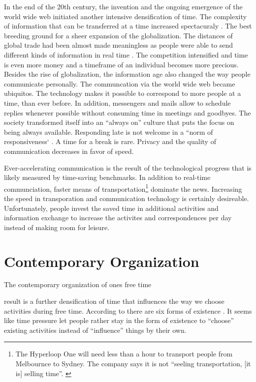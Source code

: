 \documentclass[12pt,numbers=noenddot,parskip,bibliography=totocnumbered,listof=totocnumbered]{scrreprt}
\begin{document}
In the end of the 20th century, the invention and the ongoing emergence of the world wide web initiated another intensive densification of time. The complexity of information that can be transferred at a time increased spectacuraly \citep[p.45]{wajcman2014}. The best breeding ground for a sheer expansion of the globalization. The distances of global trade had been almost made meaningless as people were able to send different kinds of information in real time \citep[p.17]{wajcman2014}. The competition intensified and time is even more money and a timeframe of an individual becomes more precious. Besides the rise of globalization, the information age also changed the way people communicate personally. The communcation via the world wide web became ubiquitos. The technology makes it possible to correspond to more people at a time, than ever before. In addition, messengers and mails allow to schedule replies whenever possible without consuming time in meetings and goodbyes. The society transformed itself into an ``always on'' culture that puts the focus on being always available. Responding late is not welcome in a ``norm of responsiveness` \citep[p.96]{wajcman2014}. A time for a break is rare. Privacy and the quality of communication decreases in favor of speed.

Ever-accelerating communication is the result of the technological progress that is likely measured by time-saving benchmarks. In addition to real-time communciation, faster means of transportation\footnote{The Hyperloop One will need less than a hour to transport people from Melbournce to Sydney. The company says it is not ``seeling transportation, [it is] selling time''. \cite{hyperloop2017}} dominate the news. Increasing the speed in transporation and communication technology is certainly desireable. Unfortunately, people invest the saved time in additional activities and information exchange to increase the activites and correspondences per day instead of making room for leisure. \citep[p.364?]{gross1994} 

\section{Contemporary Organization}
The contemporary organization of ones free time 

\citep{farmer2017}

result is a further densification of time that influences the way we choose activities during free time. According to \citeauthor{schulze2005} there are six forms of existence \citep[p.198-206]{schulze2005}. It seems like time pressure let people rather stay in the form of existence to ``choose'' existing activities instead of ``influence'' things by their own. 
\end{document}
